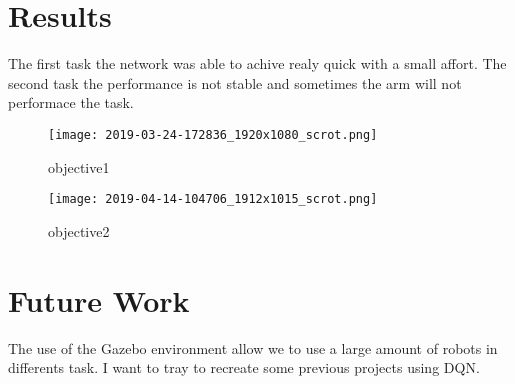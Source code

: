 \documentclass[12pt]{extarticle}
\begin{document}
\section{Results}
The first task the network was able to achive realy quick with a small affort. The second task the performance is not
stable and sometimes the arm will not performace the task.

\begin{figure}[thpb]
      \centering
      \texttt{[image: 2019-03-24-172836\_1920x1080\_scrot.png]}
      \caption{objective1}
\end{figure}

\begin{figure}[thpb]
      \centering
      \texttt{[image: 2019-04-14-104706\_1912x1015\_scrot.png]}
      \caption{objective2}
\end{figure}



\section{Future Work}

The use of the Gazebo environment allow we to use a large amount of robots in differents task. I want to tray to
recreate some previous projects using DQN.
\end{document}
